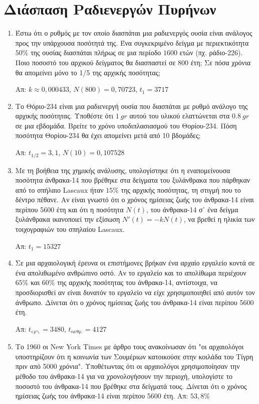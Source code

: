 \section*{Διάσπαση Ραδιενεργών Πυρήνων}

\begin{enumerate}
\item Έστω ότι ο ρυθμός με τον οποίο διασπάται μια ραδιενεργός ουσία είναι ανάλογος 
  προς την υπάρχουσα ποσότητά της. Ένα συγκεκριμένο δείγμα με περιεκτικότητα $ 50 \% $ 
  της ουσίας διασπάται πλήρως σε μια περίοδο $ 1600 $ ετών (πχ. ράδιο-226). Ποιο 
  ποσοστό του αρχικού δείγματος θα διασπαστεί σε $ 800 $ έτη; Σε πόσα χρόνια θα απομείνει
  μόνο το 1/5 της αρχικής ποσότητας; 
  
  \hfill Απ: $ k\approx 0,000433 $, $ N(800) = 0,70723 $, $ t_{1}=3717 $ 


\item Το Θόριο-234 είναι μια ραδιενεργή ουσία που διασπάται με ρυθμό ανάλογο της 
  αρχικής ποσότητας. Υποθέστε ότι $ \SI{1}{gr} $ αυτού του υλικού ελαττώνεται στα 
  $ \SI{0,8}{gr} $ σε μια εβδομάδα. Βρείτε το χρόνο υποδιπλασιασμού του Θορίου-234. 
  Πόση ποσότητα Θορίου-234 θα έχει απομείνει μετά από 10 βδομάδες;

  \hfill Απ: $ t_{1/2} = 3,1$, $ N(10)=0,107528 $  

\item Με τη βοήθεια της χημικής ανάλυσης, υπολογίστηκε ότι η εναπομείνουσα ποσότητα 
  άνθρακα-14 που βρέθηκε στα δείγματα του ξυλάνθρακα που πάρθηκαν από το σπήλαιο 
  Lascaux ήταν $ 15 \% $ της αρχικής ποσότητας, τη στιγμή που το δέντρο πέθανε. Αν 
  είναι γνωστό ότι ο χρόνος ημίσειας ζωής του άνθρακα-14 είναι περίπου 5600 έτη και 
  ότι η ποσότητα $ N(t) $, του άνθρακα-14 σ᾽ ένα δείγμα ξυλάνθρακα ικανοποιεί την 
  εξίσωση $ N'(t)=-kN(t) $, να βρεθεί η ηλικία των τοιχογραφιών του σπηλαίου Lascaux.

  \hfill Απ: $ t_{1} = 15327 $ 

\item Σε μια αρχαιολογική έρευνα οι επιστήμονες βρήκαν ένα αρχαίο εργαλείο κοντά σε ένα 
  απολιθωμένο ανθρώπινο οστό. Αν το εργαλείο και το απολίθωμα περιέχουν $ 65 \% $ και 
  $ 60 \% $ της αρχικής ποσότητας του άνθρακα-14, αντίστοιχα, να προσδιορισθεί αν 
  είναι δυνατόν το εργαλείο να είχε χρησιμοποιηθεί από αυτόν τον άνθρωπο.
  Δίνεται ότι ο χρόνος ημίσειας ζωής του άνθρακα-14 είναι περίπου 5600 έτη.

  \hfill Απ: $ t_{\text{εργ.}} = 3480 $, $ t_{\text{ανθρ.}} = 4127 $  

\item Το 1960 οι New York Times με άρθρο τους ανακοίνωσαν ότι "οι αρχαιολόγοι 
  υποστηρίζουν ότι η κοινωνία των Σουμέριων κατοικούσε στην κοιλάδα του Τίγρη πριν από 
  5000 χρόνια". Υποθέτωντας ότι οι αρχαιολόγοι χρησιμοποίησαν την μέθοδο του άνθρακα-14 
  για να χρονολογήσουν την περιοχή, υπολογίστε το ποσοστό του άνθρακα-14 που βρέθηκε 
  στα δείγματά τους. Δίνεται ότι ο χρόνος ημίσειας ζωής του άνθρακα-14 είναι περίπου 
  5600 έτη.
  \hfill Απ: $ 53,8 \% $ 
\end{enumerate}

